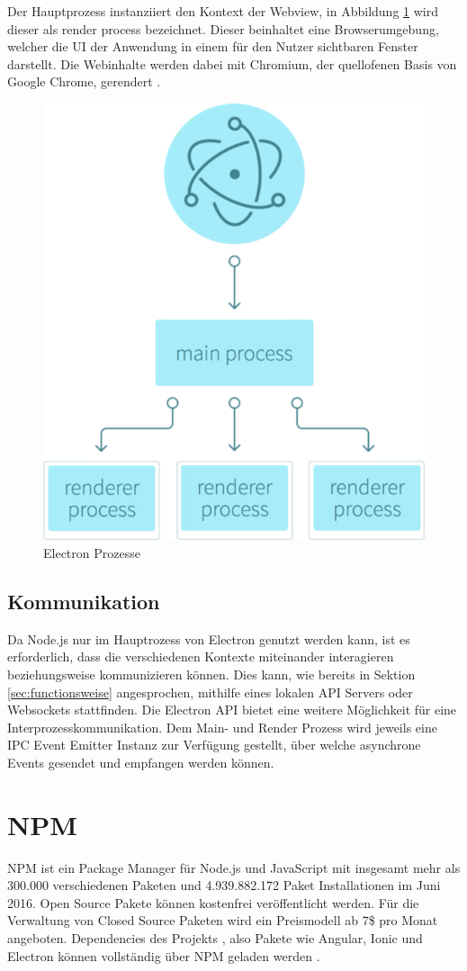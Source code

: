 Der Hauptprozess instanziiert den Kontext der Webview, in Abbildung \ref{fig:electronprozess} wird dieser als render process bezeichnet.
Dieser beinhaltet eine Browserumgebung, welcher die \ac{UI} der Anwendung in einem für den Nutzer sichtbaren Fenster darstellt.
Die Webinhalte werden dabei mit Chromium, der quellofenen Basis von Google Chrome, gerendert \cite{Build58:online}.

\begin{figure}[htbp]
 \centering
 \includegraphics[width=0.4\linewidth]{kapitel3/electron-context.png}
 \caption{Electron Prozesse \cite{Build58:online}}
\label{fig:electronprozess}
\end{figure}


\subsection{Kommunikation}
\label{sec:Kommunikation}

Da Node.js nur im Hauptrozess von Electron genutzt werden kann, ist es erforderlich,
dass die verschiedenen Kontexte miteinander interagieren beziehungsweise kommunizieren können.
Dies kann, wie bereits in Sektion \ref{sec:functionsweise} angesprochen,
mithilfe eines lokalen API Servers oder Websockets stattfinden.
Die Electron API bietet eine weitere Möglichkeit für eine Interprozesskommunikation.
Dem Main- und Render Prozess wird jeweils eine IPC Event Emitter Instanz zur Verfügung gestellt,
über welche asynchrone Events gesendet und empfangen werden können.

\section{\ac{NPM}}

\ac{NPM} ist ein Package Manager für Node.js und JavaScript mit insgesamt mehr als 300.000 verschiedenen Paketen und
4.939.882.172 Paket Installationen im Juni 2016.
Open Source Pakete können kostenfrei veröffentlicht werden.
Für die Verwaltung von Closed Source Paketen wird ein Preismodell ab 7\$ pro Monat angeboten.
Dependencies des Projekts \projectname{}, also Pakete wie Angular, Ionic und Electron können vollständig
über \ac{NPM} geladen werden \cite{npm31:online}.

